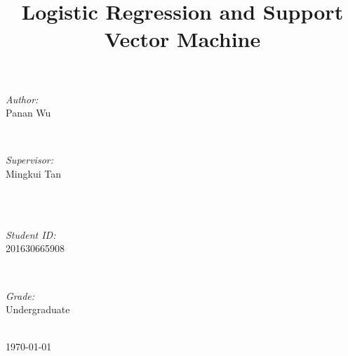\documentclass[journal, a4paper]{IEEEtran}
\begin{document}
\begin{titlepage}
\begin{minipage}{0.4\textwidth}
\begin{flushleft} \large
\emph{Author:}\\
Panan Wu %
\end{flushleft}
\end{minipage}
~
\begin{minipage}{0.4\textwidth}
\begin{flushright} \large
\emph{Supervisor:} \\
Mingkui Tan %
\end{flushright}
\end{minipage}\\[2cm]
~
\begin{minipage}{0.4\textwidth}
\begin{flushleft} \large
\emph{Student ID:}\\
201630665908
\end{flushleft}
\end{minipage}
~
\begin{minipage}{0.4\textwidth}
\begin{flushright} \large
\emph{Grade:} \\
Undergraduate
\end{flushright}
\end{minipage}\\[2cm]



{\large \today}\\[2cm] %

 

\vfill %

\end{titlepage}

	\title{Logistic Regression and Support Vector Machine}
	\maketitle
\end{document}
